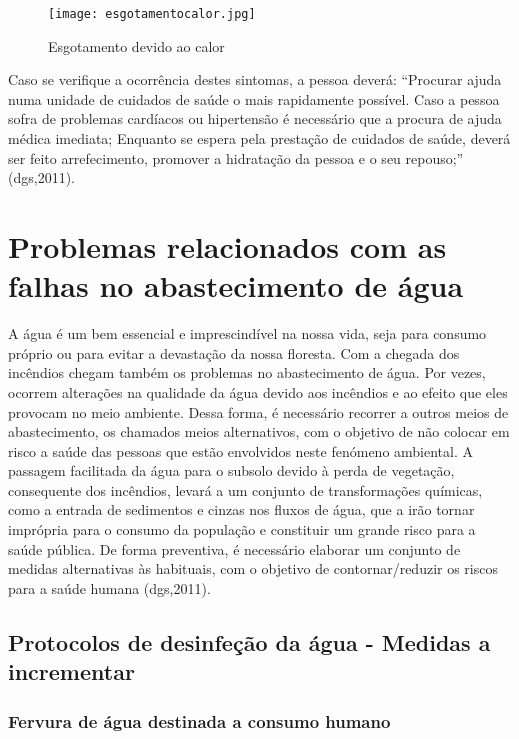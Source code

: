\documentclass{report}
\begin{document}
\begin{itemize}
\begin{figure}[H]
\center
\texttt{[image: esgotamentocalor.jpg]}
\caption{Esgotamento devido ao calor}
\end{figure}



Caso se verifique a ocorrência destes sintomas, a pessoa deverá: “Procurar ajuda numa unidade de cuidados de saúde o mais rapidamente possível. Caso a pessoa sofra de problemas cardíacos ou hipertensão é necessário que a procura de ajuda médica imediata; Enquanto se espera pela prestação de cuidados de saúde, deverá ser feito arrefecimento, promover a hidratação da pessoa e o seu repouso;” (\ac{dgs},2011).
\end{itemize}

\section{Problemas relacionados com as falhas no abastecimento de água}
\label{problemas relacionados com as falhas no abastecimento de água}
\cite{dgsriscos}

A água é um bem essencial e imprescindível na nossa vida, seja para consumo próprio ou para evitar a devastação da nossa floresta. Com a chegada dos incêndios chegam também os problemas no abastecimento de água. 
Por vezes, ocorrem alterações na qualidade da água devido aos incêndios e ao efeito que eles provocam no meio ambiente. Dessa forma, é necessário recorrer a outros meios de abastecimento, os chamados meios alternativos, com o objetivo de não colocar em risco a saúde das pessoas que estão envolvidos neste fenómeno ambiental. A passagem facilitada da água para o subsolo devido à perda de vegetação, consequente dos incêndios, levará a um conjunto de transformações químicas, como a entrada de sedimentos e cinzas nos fluxos de água, que a irão tornar imprópria para o consumo da população e constituir um grande risco para a saúde pública.
De forma preventiva, é necessário elaborar um conjunto de medidas alternativas às habituais, com o objetivo de contornar/reduzir os riscos para a saúde humana  (\ac{dgs},2011).


\subsection{Protocolos de desinfeção da água - Medidas a incrementar}

\subsubsection{Fervura de água destinada a consumo humano}
\cite{dgsriscos}
\end{document}
